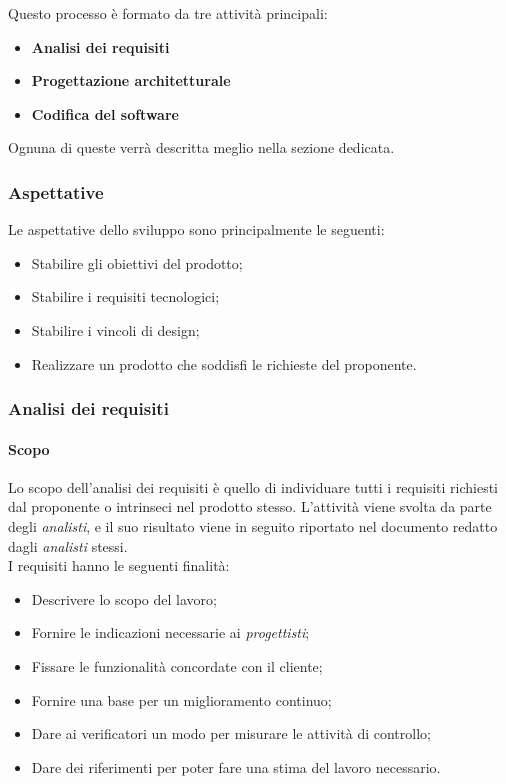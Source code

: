 Questo processo è formato da tre attività principali:
\begin{itemize}
    \item \textbf{Analisi dei requisiti}
    \item \textbf{Progettazione architetturale}
    \item \textbf{Codifica del software}
\end{itemize}

Ognuna di queste verrà descritta meglio nella sezione dedicata.

\subsubsection{Aspettative}

Le aspettative dello sviluppo sono principalmente le seguenti:

\begin{itemize}
    \item Stabilire gli obiettivi del prodotto;
    \item Stabilire i requisiti tecnologici;
    \item Stabilire i vincoli di design;
    \item Realizzare un prodotto che soddisfi le richieste del proponente.
\end{itemize}

\subsubsection{Analisi dei requisiti}

\paragraph{Scopo}

Lo scopo dell'analisi dei requisiti è quello di individuare tutti i requisiti richiesti dal proponente o intrinseci nel
prodotto stesso. L'attività viene svolta da parte degli \emph{analisti}, e il suo risultato viene in seguito riportato
nel documento  redatto dagli \emph{analisti} stessi. \\
I requisiti hanno le seguenti finalità:
\begin{itemize}
    \item Descrivere lo scopo del lavoro;
    \item Fornire le indicazioni necessarie ai \emph{progettisti};
    \item Fissare le funzionalità concordate con il cliente;
    \item Fornire una base per un miglioramento continuo;
    \item Dare ai verificatori un modo per misurare le attività di controllo;
    \item Dare dei riferimenti per poter fare una stima del lavoro necessario.
\end{itemize}

